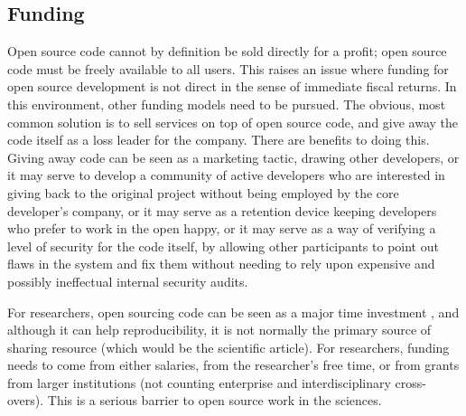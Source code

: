 




\subsection{Funding}
\label{subsec:oss-funding}

Open source code cannot by definition be sold directly for a profit; open source code must be freely available to all users. This raises an issue where funding for open source development is not direct in the sense of immediate fiscal returns. In this environment, other funding models need to be pursued. The obvious, most common solution is to sell services on top of open source code, and give away the code itself as a loss leader for the company. There are benefits to doing this. Giving away code can be seen as a marketing tactic, drawing other developers, or it may serve to develop a community of active developers who are interested in giving back to the original project without being employed by the core developer's company, or it may serve as a retention device keeping developers who prefer to work in the open happy, or it may serve as a way of verifying a level of security for the code itself, by allowing other participants to point out flaws in the system and fix them without needing to rely upon expensive and possibly ineffectual internal security audits.

For researchers, open sourcing code can be seen as a major time investment \citep{fitzjohn2014reproducible, lowndes2017our}, and although it can help reproducibility, it is not normally the primary source of sharing resource (which would be the scientific article). For researchers, funding needs to come from either salaries, from the researcher's free time, or from grants from larger institutions (not counting enterprise and interdisciplinary cross-overs). This is a serious barrier to open source work in the sciences.

